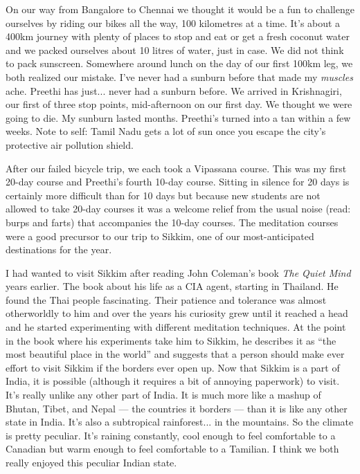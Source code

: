 \documentclass{article}
\begin{document}
On our way from Bangalore to Chennai we thought it would be a fun to challenge
ourselves by riding our bikes all the way, 100 kilometres at a time. It's about a
400km journey with plenty of places to stop and eat or get a fresh coconut water and
we packed ourselves about 10 litres of water, just in case. We did not think to pack
sunscreen. Somewhere around lunch on the day of our first 100km leg, we both realized our
mistake. I've never had a sunburn before that made my \textit{muscles} ache. Preethi
has just... never had a sunburn before. We arrived in
Krishnagiri, our first of three stop points, mid-afternoon on our first day. We
thought we were going to die. My sunburn lasted months. Preethi's turned into a tan
within a few weeks. Note to self: Tamil Nadu gets a lot of sun once you escape the
city's protective air pollution shield.

After our failed bicycle trip, we each took a Vipassana course. This was my first
20-day course and Preethi's fourth 10-day course. Sitting in silence for 20 days is
certainly more difficult than for 10 days but because new students are not allowed to
take 20-day courses it was a welcome relief from the usual noise (read: burps and
farts) that accompanies the
10-day courses. The meditation courses were a good precursor to our trip to Sikkim,
one of our most-anticipated destinations for the year.

I had wanted to visit Sikkim after reading John Coleman's book \textit{The Quiet Mind}
years earlier. The book about his life as a CIA agent, starting in Thailand. He found the Thai people
fascinating. Their patience and tolerance was almost otherworldly to him and over the
years his curiosity grew until it reached a head and he started experimenting with
different meditation techniques. At the point in the book where his experiments take
him to Sikkim, he describes it as ``the most beautiful place in the world'' and
suggests that a person should make ever effort to visit Sikkim if the borders ever
open up. Now that Sikkim is a part of India, it is possible (although it requires a
bit of annoying paperwork) to visit. It's really unlike any other part of India. It
is much more like a mashup of Bhutan, Tibet, and Nepal --- the countries it borders
--- than it is like any other state in India. It's also a subtropical
rainforest... in the mountains. So the climate is pretty peculiar. It's raining
constantly, cool enough to feel comfortable to a Canadian but warm enough to feel
comfortable to a Tamilian. I think we both really enjoyed this peculiar Indian
state.
\end{document}
